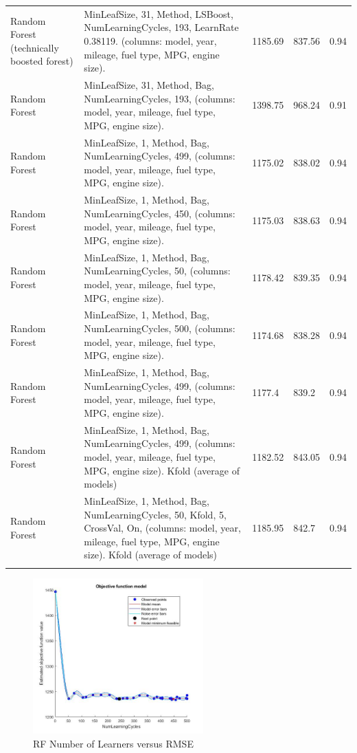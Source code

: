 \documentclass[a4pape, 11pt, english]{article}
\begin{document}
\begin{longtable}{m{3.4cm}m{6.6cm}m{1.5cm}m{1.5cm}m{1.5cm}}
\addlinespace
\hline
Random Forest (technically boosted forest) & MinLeafSize, 31, Method, LSBoost, NumLearningCycles, 193, LearnRate 0.38119. (columns: model, year, mileage, fuel type, MPG, engine size). & 1185.69 & 837.56 & 0.94 \\
\addlinespace
\hline
Random Forest & MinLeafSize, 31, Method, Bag, NumLearningCycles, 193, (columns: model, year, mileage, fuel type, MPG, engine size). & 1398.75 & 968.24 & 0.91 \\
\addlinespace
\hline
Random Forest & MinLeafSize, 1, Method, Bag, NumLearningCycles, 499, (columns: model, year, mileage, fuel type, MPG, engine size). & 1175.02 & 838.02 & 0.94 \\
\addlinespace
\hline
Random Forest & MinLeafSize, 1, Method, Bag, NumLearningCycles, 450, (columns: model, year, mileage, fuel type, MPG, engine size). & 1175.03 & 838.63 & 0.94 \\
\addlinespace
\hline
Random Forest & MinLeafSize, 1, Method, Bag, NumLearningCycles, 50, (columns: model, year, mileage, fuel type, MPG, engine size). & 1178.42 & 839.35 & 0.94 \\
\addlinespace
\hline
Random Forest & MinLeafSize, 1, Method, Bag, NumLearningCycles, 500, (columns: model, year, mileage, fuel type, MPG, engine size). & 1174.68 & 838.28 & 0.94 \\
\addlinespace
\hline
Random Forest & MinLeafSize, 1, Method, Bag, NumLearningCycles, 499, (columns: model, year, mileage, fuel type, MPG, engine size). & 1177.4 & 839.2 & 0.94 \\
\addlinespace
\hline
Random Forest & MinLeafSize, 1, Method, Bag, NumLearningCycles, 499, (columns: model, year, mileage, fuel type, MPG, engine size). Kfold (average of models) & 1182.52 & 843.05 & 0.94 \\
\addlinespace
\hline
Random Forest & MinLeafSize, 1, Method, Bag, NumLearningCycles, 50, Kfold, 5, CrossVal, On, (columns: model, year, mileage, fuel type, MPG, engine size). Kfold (average of models) & 1185.95 & 842.7 & 0.94 \\
\addlinespace
\hline
\end{longtable}

\begin{figure}%
\centering
\includegraphics[height=6cm]{img/RFNumLearCyclesVMinMRSE}
\caption{RF Number of Learners versus RMSE}
\end{figure}
\end{document}
